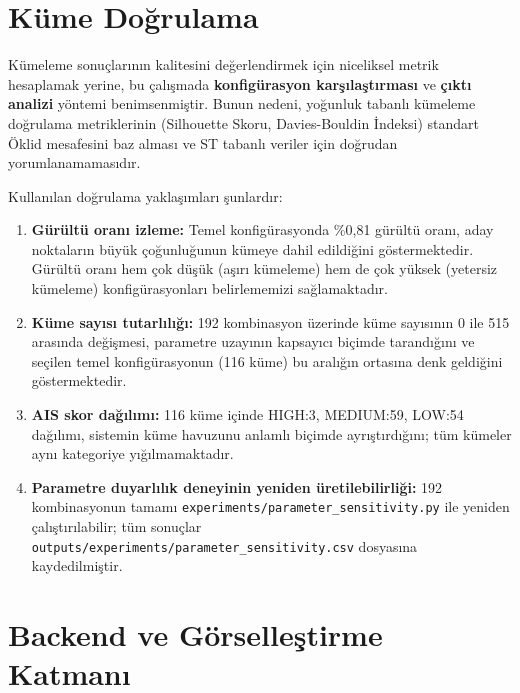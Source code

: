 \documentclass[12pt,a4paper]{article}
\begin{document}
\section{Küme Doğrulama}

Kümeleme sonuçlarının kalitesini değerlendirmek için niceliksel metrik hesaplamak yerine, bu çalışmada \textbf{konfigürasyon karşılaştırması} ve \textbf{çıktı analizi} yöntemi benimsenmiştir. Bunun nedeni, yoğunluk tabanlı kümeleme doğrulama metriklerinin (Silhouette Skoru, Davies-Bouldin İndeksi) standart Öklid mesafesini baz alması ve ST tabanlı veriler için doğrudan yorumlanamamasıdır.

Kullanılan doğrulama yaklaşımları şunlardır:

\begin{enumerate}
    \item \textbf{Gürültü oranı izleme:} Temel konfigürasyonda \%0,81 gürültü oranı, aday noktaların büyük çoğunluğunun kümeye dahil edildiğini göstermektedir. Gürültü oranı hem çok düşük (aşırı kümeleme) hem de çok yüksek (yetersiz kümeleme) konfigürasyonları belirlememizi sağlamaktadır.

    \item \textbf{Küme sayısı tutarlılığı:} 192 kombinasyon üzerinde küme sayısının 0 ile 515 arasında değişmesi, parametre uzayının kapsayıcı biçimde tarandığını ve seçilen temel konfigürasyonun (116 küme) bu aralığın ortasına denk geldiğini göstermektedir.

    \item \textbf{AIS skor dağılımı:} 116 küme içinde HIGH:3, MEDIUM:59, LOW:54 dağılımı, sistemin küme havuzunu anlamlı biçimde ayrıştırdığını; tüm kümeler aynı kategoriye yığılmamaktadır.

    \item \textbf{Parametre duyarlılık deneyinin yeniden üretilebilirliği:} 192 kombinasyonun tamamı \texttt{experiments/parameter\_sensitivity.py} ile yeniden çalıştırılabilir; tüm sonuçlar \texttt{outputs/experiments/parameter\_sensitivity.csv} dosyasına kaydedilmiştir.
\end{enumerate}

\section{Backend ve Görselleştirme Katmanı}
\end{document}
